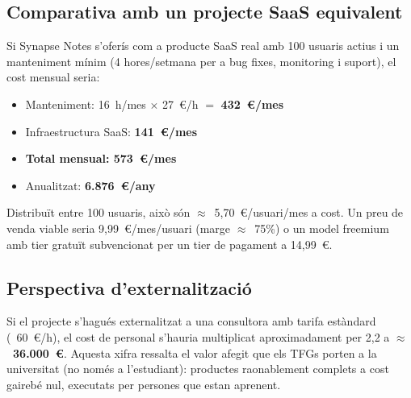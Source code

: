 \subsection{Comparativa amb un projecte SaaS equivalent}

Si Synapse Notes s'oferís com a producte SaaS real amb 100 usuaris actius i un manteniment mínim (4 hores/setmana per a bug fixes, monitoring i suport), el cost mensual seria:

\begin{itemize}
    \item Manteniment: 16~h/mes $\times$ 27~\euro{}/h $=$ \textbf{432~\euro{}/mes}
    \item Infraestructura SaaS: \textbf{141~\euro{}/mes}
    \item \textbf{Total mensual: 573~\euro{}/mes}
    \item Anualitzat: \textbf{6.876~\euro{}/any}
\end{itemize}

Distribuït entre 100 usuaris, això són $\approx$~5{,}70~\euro{}/usuari/mes a cost. Un preu de venda viable seria 9{,}99~\euro{}/mes/usuari (marge $\approx$~75\%) o un model freemium amb tier gratuït subvencionat per un tier de pagament a 14{,}99~\euro{}.

\subsection{Perspectiva d'externalització}

Si el projecte s'hagués externalitzat a una consultora amb tarifa estàndard (~60~\euro{}/h), el cost de personal s'hauria multiplicat aproximadament per 2{,}2 a \textbf{$\approx$~36.000~\euro{}}. Aquesta xifra ressalta el valor afegit que els TFGs porten a la universitat (no només a l'estudiant): productes raonablement complets a cost gairebé nul, executats per persones que estan aprenent.
